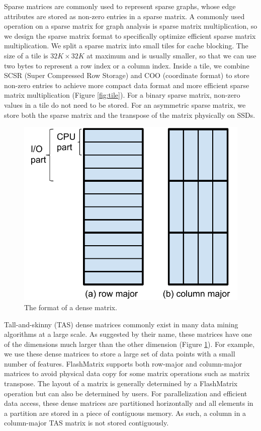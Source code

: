 Sparse matrices are commonly used to represent sparse graphs, whose edge 
attributes are stored as non-zero entries in a sparse matrix. A commonly
used operation on a sparse matrix for graph analysis is sparse matrix
multiplication, so we design the sparse matrix format to specifically
optimize efficient sparse matrix multiplication. We split a sparse matrix
into small tiles for cache blocking. The size of a tile is $32K \times 32K$
at maximum and is usually
smaller, so that we can use two bytes to represent a row index or a column
index. Inside a tile, we combine SCSR (Super Compressed Row Storage) and
COO (coordinate format) to store non-zero entries to achieve more compact
data format and more efficient sparse matrix multiplication (Figure
\ref{fig:tile}). For a binary sparse matrix, non-zero values in a tile
do not need to be stored. For an asymmetric sparse matrix, we store both
the sparse matrix and the transpose of the matrix physically on SSDs.

\begin{figure}
	\centering
	\includegraphics[scale=0.5]{./dense_matrix.pdf}
	\vspace{-5pt}
	\caption{The format of a dense matrix.}
	\vspace{-5pt}
	\label{fig:tas_mat}
\end{figure}

Tall-and-skinny (TAS) dense matrices commonly exist in many data mining
algorithms at a large scale. As suggested by their name, these matrices have
one of the dimensions much larger than the other dimension (Figure
\ref{fig:tas_mat}). For example, we use these dense matrices to store a large
set of data points with a small number of features. FlashMatrix supports both
row-major and column-major matrices to avoid physical data copy for some matrix
operations such as matrix transpose. The layout of a matrix is generally
determined by a FlashMatrix operation but can also be determined by users. 
For parallelization and efficient data access, these dense matrices are
partitioned horizontally and all elements in a partition are stored in a piece
of contiguous memory. As such, a column in a column-major TAS matrix is not
stored contiguously.

